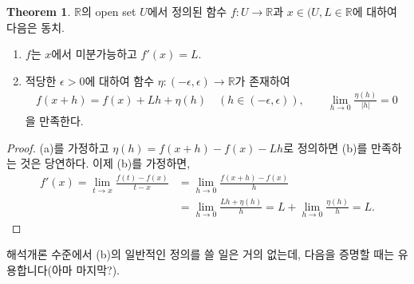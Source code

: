 \documentclass[12pt]{article}
\theoremstyle{definition}
\newtheorem{thm}{Theorem}[section]
\def\RR{\mathbb{R}}
\def\eps{\epsilon}
\newcommand{\abs}[1]{\left\vert#1\right\vert}
\begin{document}
\begin{thm}
	\(\RR\)의 open set \(U\)에서 정의된 함수 \(f: U \rightarrow \RR\)과 \(x \in (U, L \in \RR\)에 대하여 다음은 동치.
	\begin{enumerate}[label=(\alph*), leftmargin=2\parindent]
		\item
		\(f\)는 \(x\)에서 미분가능하고 \(f'(x) = L\).
		\item
		적당한 \(\eps > 0\)에 대하여 함수 \(\eta: (-\eps, \eps) \rightarrow \RR\)가 존재하여
		\begin{gather} \label{diff}
			f(x+h) = f(x) + Lh + \eta(h) \quad (h \in (-\eps, \eps)), \quad \quad \lim_{h \rightarrow 0} \frac{\eta(h)}{\abs{h}} = 0
		\end{gather}
		을 만족한다.
	\end{enumerate}
\end{thm}
\begin{proof}
	(a)를 가정하고 \(\eta(h) = f(x + h) - f(x) - Lh\)로 정의하면 (b)를 만족하는 것은 당연하다. 이제 (b)를 가정하면,
	\begin{align*}
		f'(x) = \lim_{t \rightarrow x} \frac{f(t) - f(x)}{t - x} &= \lim_{h \rightarrow 0} \frac{f(x + h) - f(x)}{h}\\
		&= \lim_{h \rightarrow 0} \frac{Lh + \eta(h)}{h} = L + \lim_{h \rightarrow 0} \frac{\eta(h)}{h} = L.
	\end{align*}
\end{proof}

해석개론 수준에서 (b)의 일반적인 정의를 쓸 일은 거의 없는데, 다음을 증명할 때는 유용합니다(아마 마지막?).
\end{document}
